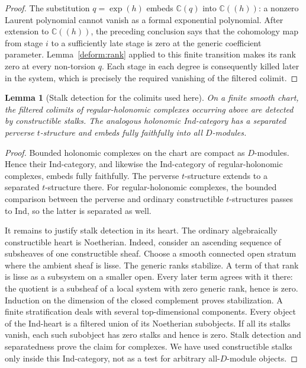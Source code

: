 \documentclass[11pt]{article}
\numberwithin{equation}{section}
\newtheorem{lemma}[theorem]{Lemma}
\theoremstyle{definition}
\theoremstyle{remark}
\begin{document}
\begin{proof}
The substitution $q=\exp(h)$ embeds $\mathbb C(q)$ into
$\mathbb C((h))$: a nonzero Laurent polynomial cannot
vanish as a formal exponential polynomial.  After extension
to $\mathbb C((h))$, the preceding conclusion says that the
cohomology map from stage $i$ to a sufficiently late stage is
zero at the generic coefficient parameter.  Lemma~\ref{deform:rank}
applied to this finite transition makes its rank zero at every
non-torsion $q$.  Each stage in each degree is consequently
killed later in the system, which is precisely the required
vanishing of the filtered colimit.
\end{proof}

\begin{lemma}[Stalk detection for the colimits used here]
\label{deform:stalks}
On a finite smooth chart, the filtered colimits of regular-holonomic
complexes occurring above are detected by constructible stalks.
The analogous holonomic Ind-category has a separated perverse
$t$-structure and embeds fully faithfully into all $D$-modules.
\end{lemma}

\begin{proof}
Bounded holonomic complexes on the chart are compact as
$D$-modules.  Hence their Ind-category, and likewise the Ind-category
of regular-holonomic complexes, embeds fully faithfully.  The
perverse $t$-structure extends to a separated $t$-structure there.
For regular-holonomic complexes, the bounded comparison between
the perverse and ordinary constructible $t$-structures passes to
Ind, so the latter is separated as well.

It remains to justify stalk detection in its heart.  The ordinary
algebraically constructible heart is Noetherian.  Indeed, consider
an ascending sequence of subsheaves of one constructible sheaf.
Choose a smooth connected open stratum where the ambient sheaf
is lisse.  The generic ranks stabilize.  A term of that rank is
lisse as a subsystem on a smaller open.  Every later term agrees
with it there: the quotient is a subsheaf of a local system with
zero generic rank, hence is zero.  Induction on the dimension of
the closed complement proves stabilization.  A finite
stratification deals with several top-dimensional components.
Every object of the Ind-heart is a filtered union of its
Noetherian subobjects.  If all its stalks vanish, each such
subobject has zero stalks and hence is zero.  Stalk detection
and separatedness prove the claim for complexes.  We have used
constructible stalks only inside this Ind-category, not as a
test for arbitrary all-$D$-module objects.
\end{proof}
\end{document}
